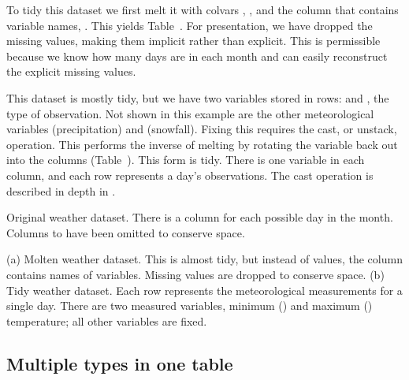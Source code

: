 \documentclass[article]{jss}
\begin{document}
To tidy this dataset we first melt it with colvars , ,  and the column that contains variable names, . This yields Table~. For presentation, we have dropped the missing values, making them implicit rather than explicit. This is permissible because we know how many days are in each month and can easily reconstruct the explicit missing values.

This dataset is mostly tidy, but we have two variables stored in rows:  and , the type of observation. Not shown in this example are the other meteorological variables  (precipitation) and  (snowfall). Fixing this requires the cast, or unstack, operation. This performs the inverse of melting by rotating the  variable back out into the columns (Table~). This form is tidy. There is one variable in each column, and each row represents a day's observations. The cast operation is described in depth in \citet{wickham:2007b}.

\begin{table}[htbp]
  \centering
  
  \caption{Original weather dataset.  There is a column for each possible day in the month.  Columns  to  have been omitted to conserve space.}
  \label{tbl:weather-raw}
\end{table}

\begin{table}[htbp]
  \centering
  \hspace{2em}%

  \caption{(a) Molten weather dataset. This is almost tidy, but instead of values, the  column contains names of variables. Missing values are dropped to conserve space. (b) Tidy weather dataset. Each row represents the meteorological measurements for a single day. There are two measured variables, minimum () and maximum () temperature; all other variables are fixed.}
  \label{tbl:weather-clean}
\end{table}

\subsection{Multiple types in one table}
\label{sub:multiple-types}
\end{document}
